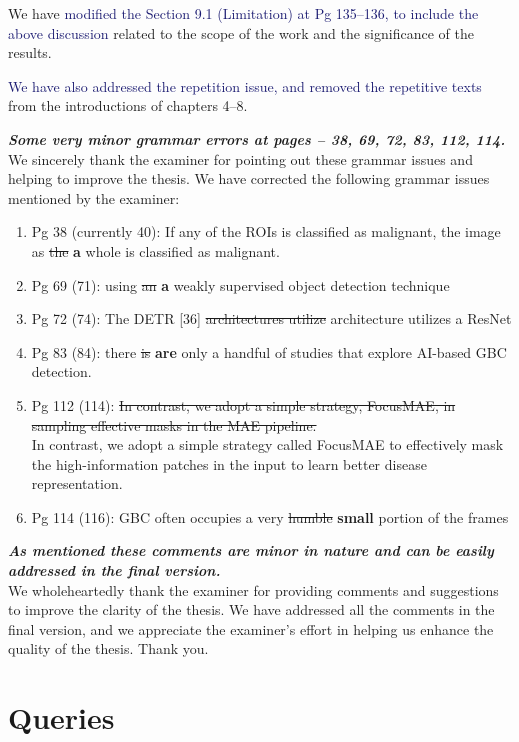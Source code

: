 \documentclass[11pt,times]{article}
\newcommand{\rev}[1]{\textcolor{MidnightBlue}{#1}}
\newcommand{\myfirstpara}[1]{\noindent \textbf{\textit{#1}}}
\newcommand{\mypara}[1]{\vspace{0.75em} \myfirstpara{#1}\\}
\begin{document}
{We have \rev{modified the Section 9.1 (Limitation) at Pg 135--136, to include the above discussion} related to the scope of the work and the significance of the results.

\rev{We have also addressed the repetition issue, and removed the repetitive texts} from the introductions of chapters 4--8. 

\mypara{Some very minor grammar errors at pages -- 38, 69, 72, 83, 112, 114.}
%
We sincerely thank the examiner for pointing out these grammar issues and helping to improve the thesis. We have corrected the following grammar issues mentioned by the examiner:  
\begin{enumerate}
\itemsep-0.1em 
    \item[] Pg 38 (currently 40): If any of the ROIs is classified as malignant, the image as \st{the} \textbf{a} whole is classified as malignant.
    \item[] Pg 69 (71): using \st{an} \textbf{a} weakly supervised object detection technique
    \item[] Pg 72 (74): The DETR [36] \st{architectures utilize} architecture utilizes a ResNet
    \item[] Pg 83 (84): there \st{is} \textbf{are} only a handful of studies that explore AI-based GBC detection.
    \item[] Pg 112 (114): \st{In contrast, we adopt a simple strategy, FocusMAE, in sampling effective masks in the MAE pipeline.} \\
    In contrast, we adopt a simple strategy called FocusMAE to effectively mask the high-information patches in the input to learn better disease representation. 
    \item[] Pg 114 (116): GBC often occupies a very \st{humble} \textbf{small} portion of the frames
\end{enumerate}

\mypara{As mentioned these comments are minor in nature and can be easily addressed in the final version.}
%
We wholeheartedly thank the examiner for providing comments and suggestions to improve the clarity of the thesis. We have addressed all the comments in the final version, and we appreciate the examiner's effort in helping us enhance the quality of the thesis. Thank you. 

\section*{Queries}

}
\end{document}
